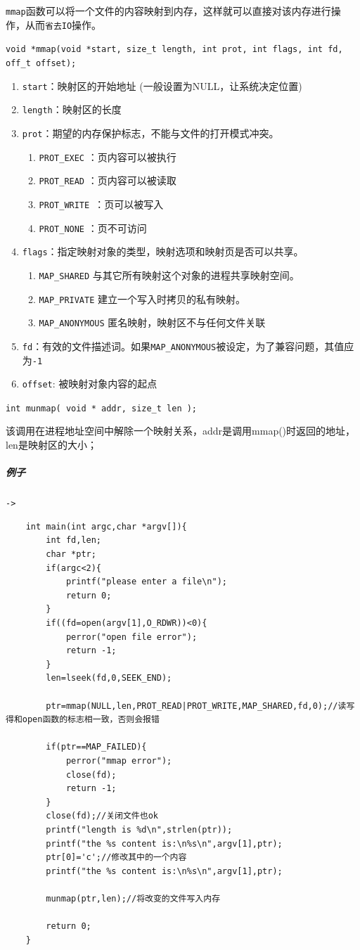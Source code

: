 \documentclass[UTF8,a4paper,8pt]{ctexbook}
\begin{document}
				\verb|mmap|函数可以将一个文件的内容映射到内存，这样就可以直接对该内存进行操作，从而\verb|省去IO|操作。
				
				\verb|void *mmap(void *start, size_t length, int prot, int flags, int fd, off_t offset);|
				
				\begin{enumerate}
					\item \verb|start|：映射区的开始地址 (一般设置为NULL，让系统决定位置)
					\item \verb|length|：映射区的长度
					\item \verb|prot|：期望的内存保护标志，不能与文件的打开模式冲突。
						\begin{enumerate}
							\item \verb|PROT_EXEC| ：页内容可以被执行
							\item \verb|PROT_READ| ：页内容可以被读取
							\item \verb|PROT_WRITE |：页可以被写入
							\item \verb|PROT_NONE| ：页不可访问
						\end{enumerate}
					\item \verb|flags|：指定映射对象的类型，映射选项和映射页是否可以共享。
						\begin{enumerate}
							\item \verb|MAP_SHARED| 与其它所有映射这个对象的进程共享映射空间。
							\item \verb|MAP_PRIVATE| 建立一个写入时拷贝的私有映射。
							\item \verb|MAP_ANONYMOUS| 匿名映射，映射区不与任何文件关联
						\end{enumerate}
					\item \verb|fd|：有效的文件描述词。如果\verb|MAP_ANONYMOUS|被设定，为了兼容问题，其值应为\verb|-1|
					\item \verb|offset|: 被映射对象内容的起点
				\end{enumerate}
		
				\verb|int munmap( void * addr, size_t len ); |
				
				该调用在进程地址空间中解除一个映射关系，addr是调用mmap()时返回的地址，len是映射区的大小；
				\subparagraph{例子}\verb|->|
				\begin{lstlisting}
	int main(int argc,char *argv[]){
		int fd,len;
		char *ptr;
		if(argc<2){
			printf("please enter a file\n");    
			return 0;
		}   
		if((fd=open(argv[1],O_RDWR))<0){
			perror("open file error");
			return -1; 
		}   
		len=lseek(fd,0,SEEK_END);   
		
		ptr=mmap(NULL,len,PROT_READ|PROT_WRITE,MAP_SHARED,fd,0);//读写得和open函数的标志相一致，否则会报错
		
		if(ptr==MAP_FAILED){
			perror("mmap error");
			close(fd);
			return -1; 
		}   
		close(fd);//关闭文件也ok
		printf("length is %d\n",strlen(ptr));
		printf("the %s content is:\n%s\n",argv[1],ptr);
		ptr[0]='c';//修改其中的一个内容
		printf("the %s content is:\n%s\n",argv[1],ptr);
		
		munmap(ptr,len);//将改变的文件写入内存
		
		return 0;
	}
				\end{lstlisting}
		
\end{document}
